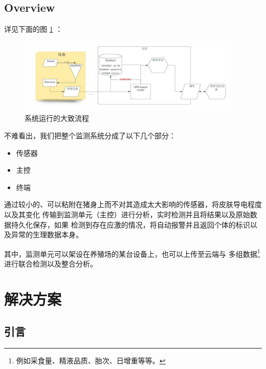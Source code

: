 \documentclass[UTF8]{ctexart}
\begin{document}
\subsection{Overview}\label{sec:22}

详见下面的图 \ref{fig:flowchart} ：

\begin{figure}[H]
\includegraphics[width=0.95\textwidth]{fc.jpeg} %
\centering
\caption{系统运行的大致流程}
\label{fig:flowchart}
\end{figure}

不难看出，我们把整个监测系统分成了以下几个部分：

\begin{itemize}
    \item 传感器
    \item 主控
    \item 终端
\end{itemize}

通过较小的、可以粘附在猪身上而不对其造成太大影响的传感器，将皮肤导电程度以及其变化
传输到监测单元（主控）进行分析，实时检测并且将结果以及原始数据持久化保存，如果
检测到存在应激的情况，将自动报警并且返回个体的标识以及异常的生理数据本身。
\par
其中，监测单元可以架设在养殖场的某台设备上，也可以上传至云端与
多组数据\footnote{例如采食量、精液品质、胎次、日增重等等。}进行联合检测以及整合分析。

\section{解决方案}

\subsection{引言}\label{sec:31}
\end{document}
